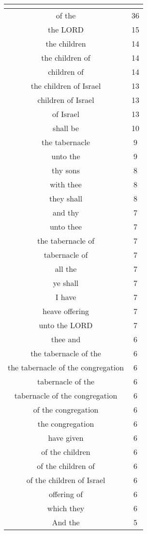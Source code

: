 \begin{center}
\begin{longtable}{|c|c|}
\hline \multicolumn{2}{c}{{ }} \\ \hline
\endfoot 
of the & 36\\ \hline 
the LORD & 15\\ \hline 
the children & 14\\ \hline 
the children of & 14\\ \hline 
children of & 14\\ \hline 
the children of Israel & 13\\ \hline 
children of Israel & 13\\ \hline 
of Israel & 13\\ \hline 
shall be & 10\\ \hline 
the tabernacle & 9\\ \hline 
unto the & 9\\ \hline 
thy sons & 8\\ \hline 
with thee & 8\\ \hline 
they shall & 8\\ \hline 
and thy & 7\\ \hline 
unto thee & 7\\ \hline 
the tabernacle of & 7\\ \hline 
tabernacle of & 7\\ \hline 
all the & 7\\ \hline 
ye shall & 7\\ \hline 
I have & 7\\ \hline 
heave offering & 7\\ \hline 
unto the LORD & 7\\ \hline 
thee and & 6\\ \hline 
the tabernacle of the & 6\\ \hline 
the tabernacle of the congregation & 6\\ \hline 
tabernacle of the & 6\\ \hline 
tabernacle of the congregation & 6\\ \hline 
of the congregation & 6\\ \hline 
the congregation & 6\\ \hline 
have given & 6\\ \hline 
of the children & 6\\ \hline 
of the children of & 6\\ \hline 
of the children of Israel & 6\\ \hline 
offering of & 6\\ \hline 
which they & 6\\ \hline 
And the & 5\\ \hline 

\end{longtable}
\end{center}
